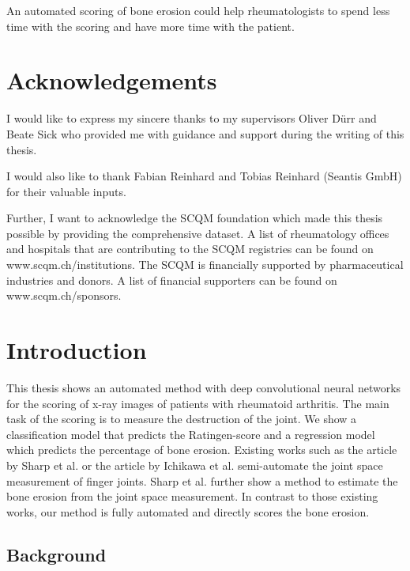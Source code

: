 \documentclass[12pt]{article}
\begin{document}
An automated scoring of bone erosion could help rheumatologists to spend less time with the scoring and have more time with the patient.

\newpage

\section*{Acknowledgements}
I would like to express my sincere thanks to my supervisors Oliver Dürr and Beate Sick who provided me with guidance and support during the writing of this thesis. 

I would also like to thank Fabian Reinhard and Tobias Reinhard (Seantis GmbH) for their valuable inputs. 

Further, I want to acknowledge the SCQM foundation which made this thesis possible by providing the comprehensive dataset. A list of rheumatology offices and hospitals that are contributing to the SCQM registries can be found on www.scqm.ch/institutions. The SCQM is financially supported by pharmaceutical industries and donors. A list of financial supporters can be found on www.scqm.ch/sponsors.

\newpage

\tableofcontents

\newpage

\section{Introduction}

This thesis shows an automated method with deep convolutional neural networks for the scoring of x-ray images of patients with rheumatoid arthritis. The main task of the scoring is to measure the destruction of the joint. \cite{rau_2007} We show a classification model that predicts the Ratingen-score and a regression model which predicts the percentage of bone erosion. Existing works such as the article by Sharp et al. \cite{sharp_2000} or the article by Ichikawa et al. \cite{ichikawa_2017} semi-automate the joint space measurement of finger joints. Sharp et al. further show a method to estimate the bone erosion from the joint space measurement. In contrast to those existing works, our method is fully automated and directly scores the bone erosion.

\subsection{Background}
\end{document}
